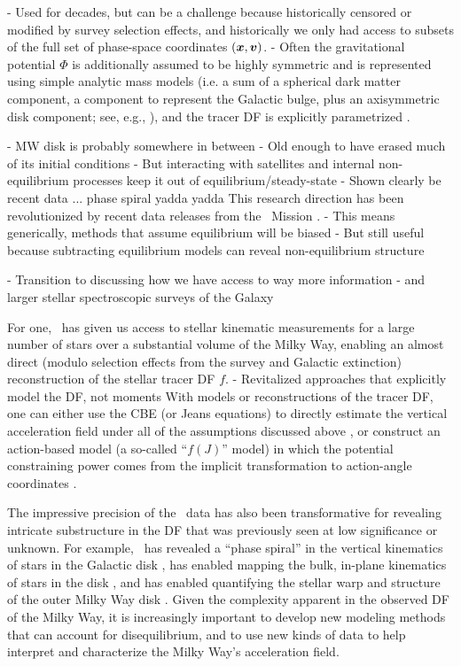 - Used for decades, but can be a challenge because historically censored or modified by
survey selection effects, and historically we only had access to subsets of the full set
of phase-space coordinates $(\boldsymbol{x}, \boldsymbol{v})$.
- Often the gravitational potential $\Phi$ is additionally assumed to be highly
symmetric and is represented using simple analytic mass models (i.e. a sum of a
spherical dark matter component, a component to represent the Galactic bulge, plus an
axisymmetric disk component; see, e.g., \citealt{TODO}), and the tracer DF is explicitly
parametrized \citep[e.g.,][]{TODO}.

- MW disk is probably somewhere in between
- Old enough to have erased much of its initial conditions
- But interacting with satellites and internal non-equilibrium processes keep it out of equilibrium/steady-state
- Shown clearly be recent data ... phase spiral yadda yadda
This research direction has been revolutionized by recent data releases from the \gaia\
Mission \citep{TODO}.
- This means generically, methods that assume equilibrium will be biased
- But still useful because subtracting equilibrium models can reveal non-equilibrium structure

- Transition to discussing how we have access to way more information
- and larger stellar spectroscopic surveys of the Galaxy \citep{APOGEE, GALAH, RAVE, LAMOST, TODO}



For one, \gaia\ has given us access to stellar kinematic measurements for a large number
of stars over a substantial volume of the Milky Way, enabling an almost direct (modulo
selection effects from the survey and Galactic extinction) reconstruction of the stellar
tracer DF $f$.
- Revitalized approaches that explicitly model the DF, not moments
With models or reconstructions of the tracer DF, one can either use the CBE (or Jeans
equations) to directly estimate the vertical acceleration field under all of the
assumptions discussed above \citep{greggreen, jatanbuch, TODO}, or construct an
action-based model (a so-called ``$f(J)$'' model) in which the potential constraining
power comes from the implicit transformation to action-angle coordinates \citep{sanders,
others}.

The impressive precision of the \gaia\ data has also been transformative for revealing
intricate substructure in the DF that was previously seen at low significance or
unknown.
For example, \gaia\ has revealed a ``phase spiral'' in the vertical kinematics of stars
in the Galactic disk \citep[e.g.,][]{Antoja, many, TODO}, has enabled mapping the bulk,
in-plane kinematics of stars in the disk \citep[e.g.,][]{Katz, Eilers, TODO}, and has
enabled quantifying the stellar warp and structure of the outer Milky Way disk
\citep[e.g.,][]{Poggio, Antoja, TODO}.
Given the complexity apparent in the observed DF of the Milky Way, it is increasingly
important to develop new modeling methods that can account for disequilibrium, and to
use new kinds of data to help interpret and characterize the Milky Way's acceleration
field.

